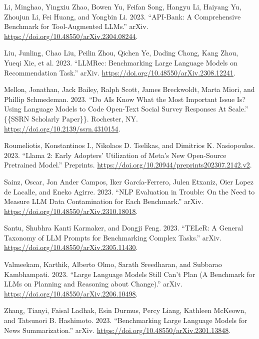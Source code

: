\documentclass[
]{article}
\newlength{\cslhangindent}
\newenvironment{CSLReferences}[2] %
 {\begin{list}{}{%
  \setlength{\itemindent}{0pt}
  \setlength{\leftmargin}{0pt}
  \setlength{\parsep}{0pt}
  \ifodd #1
   \setlength{\leftmargin}{\cslhangindent}
   \setlength{\itemindent}{-1\cslhangindent}
  \fi
  \setlength{\itemsep}{#2\baselineskip}}}
 {\end{list}}
\begin{document}
\begin{CSLReferences}{1}{0}
Li, Minghao, Yingxiu Zhao, Bowen Yu, Feifan Song, Hangyu Li, Haiyang Yu,
Zhoujun Li, Fei Huang, and Yongbin Li. 2023. {``{API-Bank}: {A
Comprehensive Benchmark} for {Tool-Augmented LLMs}.''} {arXiv}.
\url{https://doi.org/10.48550/arXiv.2304.08244}.

Liu, Junling, Chao Liu, Peilin Zhou, Qichen Ye, Dading Chong, Kang Zhou,
Yueqi Xie, et al. 2023. {``{LLMRec}: {Benchmarking Large Language
Models} on {Recommendation Task}.''} {arXiv}.
\url{https://doi.org/10.48550/arXiv.2308.12241}.

Mellon, Jonathan, Jack Bailey, Ralph Scott, James Breckwoldt, Marta
Miori, and Phillip Schmedeman. 2023. {``Do {AIs Know What} the {Most
Important Issue} Is? {Using Language Models} to {Code Open-Text Social
Survey Responses At Scale}.''} \{\{SSRN Scholarly Paper\}\}. {Rochester,
NY}. \url{https://doi.org/10.2139/ssrn.4310154}.

Roumeliotis, Konstantinos I., Nikolaos D. Tselikas, and Dimitrios K.
Nasiopoulos. 2023. {``Llama 2: {Early Adopters}' {Utilization} of
{Meta}'s {New Open-Source Pretrained Model}.''} {Preprints}.
\url{https://doi.org/10.20944/preprints202307.2142.v2}.

Sainz, Oscar, Jon Ander Campos, Iker García-Ferrero, Julen Etxaniz, Oier
Lopez de Lacalle, and Eneko Agirre. 2023. {``{NLP Evaluation} in
Trouble: {On} the {Need} to {Measure LLM Data Contamination} for Each
{Benchmark}.''} {arXiv}.
\url{https://doi.org/10.48550/arXiv.2310.18018}.

Santu, Shubhra Kanti Karmaker, and Dongji Feng. 2023. {``{TELeR}: {A
General Taxonomy} of {LLM Prompts} for {Benchmarking Complex Tasks}.''}
{arXiv}. \url{https://doi.org/10.48550/arXiv.2305.11430}.

Valmeekam, Karthik, Alberto Olmo, Sarath Sreedharan, and Subbarao
Kambhampati. 2023. {``Large {Language Models Still Can}'t {Plan} ({A
Benchmark} for {LLMs} on {Planning} and {Reasoning} about {Change}).''}
{arXiv}. \url{https://doi.org/10.48550/arXiv.2206.10498}.

Zhang, Tianyi, Faisal Ladhak, Esin Durmus, Percy Liang, Kathleen
McKeown, and Tatsunori B. Hashimoto. 2023. {``Benchmarking {Large
Language Models} for {News Summarization}.''} {arXiv}.
\url{https://doi.org/10.48550/arXiv.2301.13848}.

\end{CSLReferences}
\end{document}
